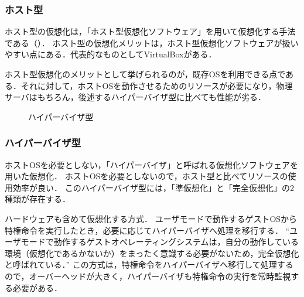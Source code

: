 \subsubsection*{ホスト型}
ホスト型の仮想化は，「ホスト型仮想化ソフトウェア」を用いて仮想化する手法である（）．
ホスト型の仮想化メリットは，ホスト型仮想化ソフトウェアが扱いやすい点にある．代表的なものとしてVirtualBoxがある．\par
ホスト型仮想化のメリットとして挙げられるのが，既存OSを利用できる点である．それに対して，ホストOSを動作させるためのリソースが必要になり，物理サーバはもちろん，後述するハイパーバイザ型に比べても性能が劣る\cite{itmanage}．

\begin{wrapfigure}{r}[0mm]{.3\textwidth}
    \centering
    \caption{ハイパーバイザ型}
    \label{fig:ハイパーバイザ型}
    \vspace{-1cm}
\end{wrapfigure}

\subsubsection*{ハイパーバイザ型}
ホストOSを必要としない，「ハイパーバイザ」と呼ばれる仮想化ソフトウェアを用いた仮想化．
ホストOSを必要としないので，ホスト型と比べてリソースの使用効率が良い．
このハイパーバイザ型には，「準仮想化」と「完全仮想化」の2種類が存在する．
\begin{description}
    \setlength{\leftskip}{1em}
    \item[完全仮想化] ハードウェアも含めて仮想化する方式．
        ユーザモードで動作するゲストOSから特権命令を実行したとき，必要に応じてハイパーバイザへ処理を移行する．
        ``ユーザモードで動作するゲストオペレーティングシステムは，自分の動作している環境（仮想化であるかないか）をまったく意識する必要がないため，完全仮想化と呼ばれている．''\cite[p.159]{オペレーティングシステム}
        この方式は，特権命令をハイパーバイザへ移行して処理するので，オーバーヘッドが大きく，ハイパーバイザも特権命令の実行を常時監視する必要がある．
\end{description}

